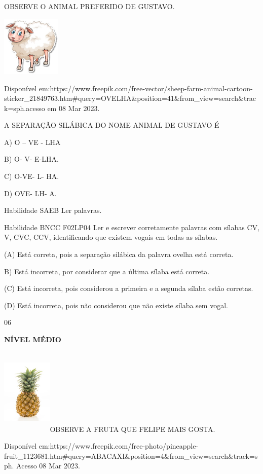 {{OBSERVE O ANIMAL PREFERIDO DE GUSTAVO.

\includegraphics[width=1.11458in,height=1.13889in]{media/image142.jpeg}

Disponível
em:https://www.freepik.com/free-vector/sheep-farm-animal-cartoon-sticker\_21849763.htm\#query=OVELHA\&position=41\&from\_view=search\&track=sph.acesso
em 08 Mar 2023.

A SEPARAÇÃO SILÁBICA DO NOME ANIMAL DE GUSTAVO É

A) O -- VE - LHA

B) O- V- E-LHA.

C) O-VE- L- HA.

D) OVE- LH- A.

Habilidade SAEB Ler palavras.

Habilidade BNCC F02LP04 Ler e escrever corretamente palavras com sílabas
CV, V, CVC, CCV, identificando que existem vogais em todas as sílabas.

(A) Está correta, pois a separação silábica da palavra ovelha está
correta.

B) Está incorreta, por considerar que a última sílaba está correta.

(C) Está incorreta, pois considerou a primeira e a segunda sílaba estão
corretas.

(D) Está incorreta, pois não considerou que não existe sílaba sem vogal.

\num{06}

\textbf{NÍVEL MÉDIO}

\includegraphics[width=0.94236in,height=1.64306in]{media/image143.jpeg}OBSERVE
A FRUTA QUE FELIPE MAIS GOSTA.

Disponível
em:https://www.freepik.com/free-photo/pineapple-fruit\_1123681.htm\#query=ABACAXI\&position=4\&from\_view=search\&track=sph.
Acesso 08 Mar 2023.

}}
